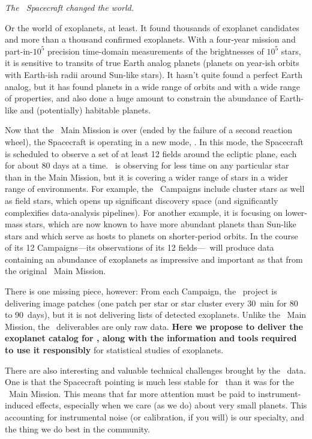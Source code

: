 \documentclass[12pt,preprint]{aastex}
\begin{document}
\emph{The \kepler\ Spacecraft changed the world.}

Or the world of exoplanets, at least.
It found thousands of exoplanet candidates and more than a thousand
confirmed exoplanets.
With a four-year mission and part-in-$10^5$ precision time-domain
measurements of the brightnesses of $10^5$ stars, it is sensitive to
transits of true Earth analog planets (planets on year-ish orbits with
Earth-ish radii around Sun-like stars).
It hasn't quite found a perfect Earth analog, but it has found planets
in a wide range of orbits and with a wide range of properties, and
also done a huge amount to constrain the abundance of Earth-like and
(potentially) habitable planets.

Now that the \kepler\ Main Mission is over (ended by the failure of a
second reaction wheel), the Spacecraft is operating in a new mode,
\kt.
In this mode, the Spacecraft is scheduled to observe a set of at least 12
fields around the ecliptic plane, each for about 80 days at a time.
\kt\ is observing for less time on any particular star than in the
Main Mission, but it is covering a wider range of stars in a wider
range of environments.
For example, the \kt\ Campaigns include cluster stars as well as field
stars, which opens up significant discovery space (and significantly
complexifies data-analysis pipelines).
For another example, it is focusing on lower-mass stars, which are now
known to have more abundant planets than Sun-like stars and which
serve as hosts to planets on shorter-period orbits.
In the course of its 12 Campaigns---its observations of its 12
fields---\kt\ will produce data containing an abundance of exoplanets as
impressive and important as that from the original \kepler\ Main
Mission.

There is one missing piece, however:
From each Campaign, the \kt\ project is delivering image patches (one
patch per star or star cluster every 30~min for 80 to 90~days), but it
is not delivering lists of detected exoplanets.
Unlike the \kepler\ Main Mission, the \kt\ deliverables are only raw
data.
\textbf{Here we propose to deliver the exoplanet catalog for \kt,
along with the information and tools required to use it responsibly}
for statistical studies of exoplanets.

There are also interesting and valuable technical challenges brought
by the \kt\ data.
One is that the Spacecraft pointing is much less stable for \kt\ than
it was for the \kepler\ Main Mission.
This means that far more attention must be paid to instrument-induced
effects, especially when we care (as we do) about very small planets.
This accounting for instrumental noise (or calibration, if you will)
is our specialty, and the thing we do best in the community.
\end{document}
